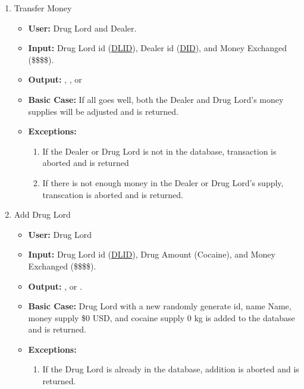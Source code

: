 \documentclass[11pt, oneside]{article}   	%
\theoremstyle{definition}
\theoremstyle{remark}
\begin{document}
\begin{enumerate}
	
	\item Transfer Money
	\begin{itemize}
		\item \textbf{User:} Drug Lord and Dealer.
		\item \textbf{Input:} Drug Lord id (\underline{DLID}), Dealer id (\underline{DID}), and Money Exchanged (\$\$\$\$).
		\item \textbf{Output:} , , or 
		\item \textbf{Basic Case:} If all goes well, both the Dealer and Drug Lord's money supplies will be adjusted and  is returned.
		\item \textbf{Exceptions:}
		\begin{enumerate}
			\item If the Dealer or Drug Lord is not in the database, transaction is aborted and  is returned
			\item If there is not enough money in the Dealer or Drug Lord's supply, transcation is aborted and  is returned.
		\end{enumerate}
	\end{itemize}
		
	\item Add Drug Lord
	\begin{itemize}
		\item \textbf{User:} Drug Lord
		\item \textbf{Input:} Drug Lord id (\underline{DLID}), Drug Amount (Cocaine), and Money Exchanged (\$\$\$\$).
		\item \textbf{Output:} , or .
		\item \textbf{Basic Case:} Drug Lord with a new randomly generate id, name Name, money supply \$0 USD, and cocaine supply  0 kg is added to the database and  is returned.
		\item \textbf{Exceptions:}
		\begin{enumerate}
			\item If the Drug Lord is already in the database, addition is aborted and  is returned.
		\end{enumerate}
	\end{itemize}
		

\end{enumerate}
\end{document}
